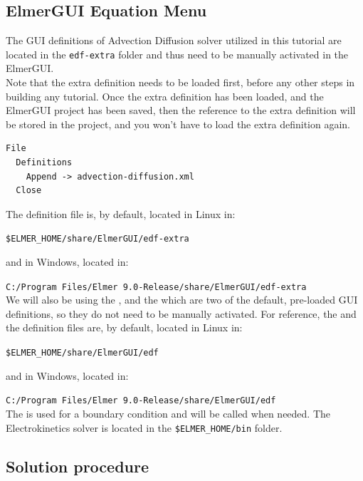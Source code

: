 \subsection*{ElmerGUI Equation Menu}

The GUI definitions of Advection Diffusion solver utilized in this tutorial are located in the \texttt{edf-extra} folder and thus need to be manually activated in the ElmerGUI.\\

Note that the extra definition needs to be loaded first, before any other steps in building any tutorial.  Once the extra definition has been loaded, and the ElmerGUI project has been saved, then the reference to the extra definition will be stored in the project, and you won't have to load the extra definition again.

\begin{verbatim}
File
  Definitions
    Append -> advection-diffusion.xml
  Close
\end{verbatim}

\noindent The \texttt{} definition file is, by default, located in Linux in:

\texttt{\$ELMER\_HOME/share/ElmerGUI/edf-extra}

\noindent and in Windows, located in:

\texttt{C:/Program Files/Elmer 9.0-Release/share/ElmerGUI/edf-extra}\\

We will also be using the , and the   which are two of the default, pre-loaded GUI definitions, so they do not need to be manually activated.  For reference, the  \texttt{}  and the  \texttt{} definition files are, by default, located in Linux in:

\texttt{\$ELMER\_HOME/share/ElmerGUI/edf}

\noindent and in Windows, located in:

\texttt{C:/Program Files/Elmer 9.0-Release/share/ElmerGUI/edf}\\

The  is used for a boundary condition and will be called when needed.  The Electrokinetics solver is located in the \texttt{\$ELMER\_HOME/bin} folder.

\subsection*{Solution procedure}

